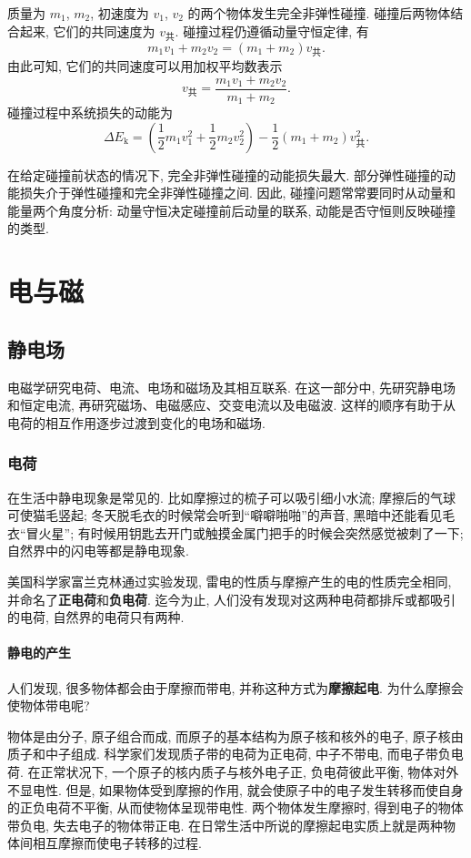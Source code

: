 \documentclass[UTF8,openany,fontset=fandol]{ctexbook}
\theoremstyle{chinesetextbook}
\begin{document}
质量为 $m_1$, $m_2$, 初速度为 $v_1$, $v_2$ 的两个物体发生完全非弹性碰撞. 碰撞后两物体结合起来, 它们的共同速度为 $v_\text{共}$. 碰撞过程仍遵循动量守恒定律, 有
\[
m_1v_1+m_2v_2=(m_1+m_2)v_\text{共}.
\]
由此可知, 它们的共同速度可以用加权平均数表示
\begin{equation}
v_\text{共}=\frac{m_1v_1+m_2v_2}{m_1+m_2}.
\end{equation}
碰撞过程中系统损失的动能为
\[
\Delta E_\mathrm{k}=\left(\frac12 m_1 v_1^2+\frac12 m_2 v_2^2\right)-\frac12(m_1+m_2)v_\text{共}^2.
\]

在给定碰撞前状态的情况下, 完全非弹性碰撞的动能损失最大. 部分弹性碰撞的动能损失介于弹性碰撞和完全非弹性碰撞之间. 因此, 碰撞问题常常要同时从动量和能量两个角度分析: 动量守恒决定碰撞前后动量的联系, 动能是否守恒则反映碰撞的类型.
\part{电与磁}
\chapter{静电场}
电磁学研究电荷、电流、电场和磁场及其相互联系. 在这一部分中, 先研究静电场和恒定电流, 再研究磁场、电磁感应、交变电流以及电磁波. 这样的顺序有助于从电荷的相互作用逐步过渡到变化的电场和磁场.
\section{电荷}
在生活中静电现象是常见的. 比如摩擦过的梳子可以吸引细小水流; 摩擦后的气球可使猫毛竖起; 冬天脱毛衣的时候常会听到“噼噼啪啪”的声音, 黑暗中还能看见毛衣“冒火星”; 有时候用钥匙去开门或触摸金属门把手的时候会突然感觉被刺了一下; 自然界中的闪电等都是静电现象.

美国科学家富兰克林通过实验发现, 雷电的性质与摩擦产生的电的性质完全相同, 并命名了\textbf{正电荷}和\textbf{负电荷}. 迄今为止, 人们没有发现对这两种电荷都排斥或都吸引的电荷, 自然界的电荷只有两种.
\subsection{静电的产生}
人们发现, 很多物体都会由于摩擦而带电, 并称这种方式为\textbf{摩擦起电}. 为什么摩擦会使物体带电呢?

物体是由分子, 原子组合而成, 而原子的基本结构为原子核和核外的电子, 原子核由质子和中子组成. 科学家们发现质子带的电荷为正电荷, 中子不带电, 而电子带负电荷. 在正常状况下, 一个原子的核内质子与核外电子正, 负电荷彼此平衡, 物体对外不显电性. 但是, 如果物体受到摩擦的作用, 就会使原子中的电子发生转移而使自身的正负电荷不平衡, 从而使物体呈现带电性. 两个物体发生摩擦时, 得到电子的物体带负电, 失去电子的物体带正电. 在日常生活中所说的摩擦起电实质上就是两种物体间相互摩擦而使电子转移的过程.
\end{document}
